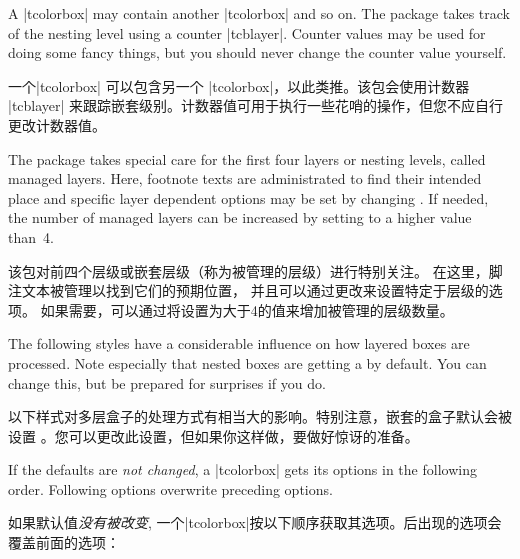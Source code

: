 A |tcolorbox| may contain another |tcolorbox| and so on. The package
takes track of the nesting level using a counter |tcblayer|. Counter values
may be used for doing some fancy things, but you should never change
the counter value yourself.

一个|tcolorbox| 可以包含另一个 |tcolorbox|，以此类推。该包会使用计数器 |tcblayer| 来跟踪嵌套级别。计数器值可用于执行一些花哨的操作，但您不应自行更改计数器值。


The package takes special care for the first four layers or nesting levels,
called managed layers.
Here, footnote texts are administrated to find their intended place
and specific layer dependent options may be set by changing
.
If needed, the number of managed layers can be increased by setting
 to a higher value than~4.

该包对前四个层级或嵌套层级（称为被管理的层级）进行特别关注。 在这里，脚注文本被管理以找到它们的预期位置， 并且可以通过更改来设置特定于层级的选项。 如果需要，可以通过将设置为大于4的值来增加被管理的层级数量。



The following styles have a considerable influence on how layered boxes
are processed. Note especially that nested boxes are getting a
 by default. You can change this, but be prepared for
surprises if you do.

以下样式对多层盒子的处理方式有相当大的影响。特别注意，嵌套的盒子默认会被设置  。您可以更改此设置，但如果你这样做，要做好惊讶的准备。

If the defaults are \emph{not changed}, a |tcolorbox| gets its options
in the following order. Following options overwrite preceding options.

如果默认值\emph{没有被改变}, 一个|tcolorbox|按以下顺序获取其选项。后出现的选项会覆盖前面的选项：


